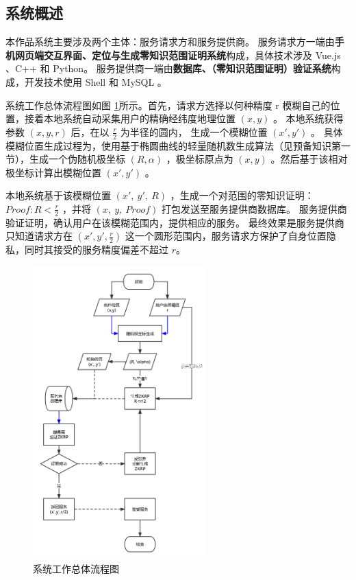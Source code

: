 \documentclass[zihao=-4]{ctexart}
\begin{document}
\subsection{系统概述}
本作品系统主要涉及两个主体：服务请求方和服务提供商。
服务请求方一端由\textbf{手机网页端交互界面、定位与生成零知识范围证明系统}构成，具体技术涉及 Vue.js 、C++ 和 Python。
服务提供商一端由\textbf{数据库、（零知识范围证明）验证系统}构成，开发技术使用 Shell 和 MySQL 。
\par
系统工作总体流程图如图 \ref{flowchart}所示。首先，请求方选择以何种精度 r 模糊自己的位置，接着本地系统自动采集用户的精确经纬度地理位置 $(x, y)$ 。
本地系统获得参数 $(x, y, r)$ 后，在以 $\frac{r}{2}$ 为半径的圆内， 生成一个模糊位置 $(x',y')$ 。
具体模糊位置生成过程为，使用基于椭圆曲线的轻量随机数生成算法（见预备知识第一节），生成一个伪随机极坐标 $(R, \alpha)$ ，极坐标原点为 $(x,y)$ 。然后基于该相对极坐标计算出模糊位置 $(x',y')$ 。
\par
本地系统基于该模糊位置 $(x',\ y',\ R)$ ，生成一个对范围的零知识证明：$Proof: R<\frac{r}{2}$ ，并将 $(x,\ y,\ Proof)$ 打包发送至服务提供商数据库。
服务提供商验证证明，确认用户在该模糊范围内，提供相应的服务。
最终效果是服务提供商只知道请求方在 $(x',y',\frac{r}{2})$ 这一个圆形范围内，服务请求方保护了自身位置隐私，同时其接受的服务精度偏差不超过 $r$。
\begin{figure}[H] %
    \centering %
    \includegraphics[width=0.6\textwidth]{系统工作流程图.jpg} %
    \caption{系统工作总体流程图} %
    \label{flowchart} %
\end{figure}
\end{document}
